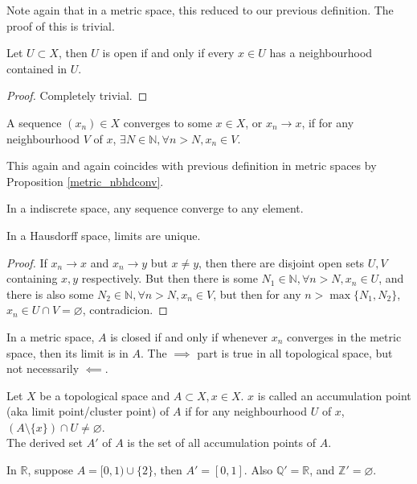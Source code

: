 Note again that in a metric space, this reduced to our previous definition.
The proof of this is trivial.
\begin{proposition}
    Let $U\subset X$, then $U$ is open if and only if every $x\in U$ has a neighbourhood contained in $U$.
\end{proposition}
\begin{proof}
    Completely trivial.
\end{proof}
\begin{definition}
    A sequence $(x_n)\in X$ converges to some $x\in X$, or $x_n\to x$, if for any neighbourhood $V$ of $x$, $\exists N\in\mathbb N,\forall n>N, x_n\in V$.
\end{definition}
This again and again coincides with previous definition in metric spaces by Proposition \ref{metric_nbhdconv}.
\begin{example}
    In a indiscrete space, any sequence converge to any element.
\end{example}
\begin{theorem}
    In a Hausdorff space, limits are unique.
\end{theorem}
\begin{proof}
    If $x_n\to x$ and $x_n\to y$ but $x\neq y$, then there are disjoint open sets $U,V$ containing $x,y$ respectively.
    But then there is some $N_1\in\mathbb N,\forall n>N, x_n\in U$, and there is also some $N_2\in\mathbb N,\forall n>N, x_n\in V$, but then for any $n>\max\{N_1,N_2\}$, $x_n\in U\cap V=\varnothing$, contradicion.
\end{proof}
\begin{remark}
    In a metric space, $A$ is closed if and only if whenever $x_n$ converges in the metric space, then its limit is in $A$.
    The $\implies$ part is true in all topological space, but not necessarily $\impliedby$.
\end{remark}
\begin{definition}
    Let $X$ be a topological space and $A\subset X,x\in X$.
    $x$ is called an accumulation point (aka limit point/cluster point) of $A$ if for any neighbourhood $U$ of $x$, $(A\setminus\{x\})\cap U\neq\varnothing$.\\
    The derived set $A'$ of $A$ is the set of all accumulation points of $A$.
\end{definition}
\begin{example}
    In $\mathbb R$, suppose $A=[0,1)\cup \{2\}$, then $A'=[0,1]$.
    Also $\mathbb Q'=\mathbb R$, and $\mathbb Z'=\varnothing$.
\end{example}
